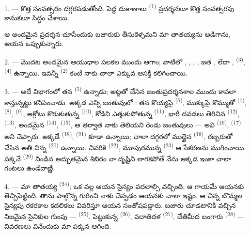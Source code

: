 1. --- కొత్త సంవత్సరం దగ్గరపడుతోంది. పెద్ద దుకాణాలు 
\textsuperscript{(1)} ప్రదర్శనలూ కొత్త సంవత్సరపు కానుకలూ సిద్ధం చేశాయి.

ఆ అందమైన ప్రదర్శన చూసేందుకు బజారుకు తీసుకెళ్ళమని మా తాతయ్యను అడిగాను, ఆయన ఒప్పుకున్నారు.

2. --- మొదట అందమైన ఆయుధాల పలకల ముందు ఆగాం; వాటిలో ,
, , , జత
, లేదా ,  \textsuperscript{(3)},
 \textsuperscript{(4)} ఉన్నాయి. ఇవన్నీ 
\textsuperscript{(2)} కంటే నాకు చాలా ఎక్కువ ఆసక్తి కలిగించాయి.

\VUsaut{3.0mm}
\VUsaut{2.6mm}

3. --- అదే విభాగంలో తన  
\textsuperscript{(5)} ఉన్నాడు; అట్టతో చేసిన జంతుప్రదర్శనశాల ముందు కాపలా కాస్తున్నట్టు
కనిపించాడు. అక్కడ ఎన్ని జంతువులో : తన కొయ్యపై  \textsuperscript{(6)},
ముక్కుపై కొమ్ముతో  \textsuperscript{(7)}, 
\textsuperscript{(8)},  \textsuperscript{(9)}, అక్రోటు కొరుకుతున్న
 \textsuperscript{(10)}, కోడిని ఎత్తుకుపోతున్న 
\textsuperscript{(11)}, భారీ దవడలు తెరిచిన  \textsuperscript{(12)},
 \textsuperscript{(13)}, అందమైన 
\textsuperscript{(14)},  \textsuperscript{(15)}, ఆ తర్వాత నాకు
తెలియని రెండు జంతువులు — అవి  \textsuperscript{(16)},
 \textsuperscript{(17)} అని చెప్పారు. అక్కడే 
\textsuperscript{(18)},  \textsuperscript{(21)} కూడా ఉన్నాయి; చాలా
దగ్గరలో ముద్దైన  \textsuperscript{(19)}, రబ్బరుతో చేసిన అతి చిన్న
 \textsuperscript{(20)} ఉన్నాయి. చివరికి 
\textsuperscript{(22)}, మూపురమున్న  \textsuperscript{(23)} ఆ
సేకరణను ముగించాయి. పక్కనే  \textsuperscript{(29)} నిండిన
అద్భుతమైన శిబిరం నా దృష్టిని లాగకపోతే నేను అక్కడ ఇంకా చాలా గంటలు ఉండేవాణ్ణి.

\VUsaut{4.0mm}
\VUsaut{2.8mm}

4. --- మా తాతయ్య  \textsuperscript{(24)}; ఒక 
వల్ల ఆయన సైన్యం వదలాల్సి వచ్చింది, ఆ గాయమే ఆయనకు  తెచ్చిపెట్టింది.
తాను పాల్గొన్న  గురించి నాకు చెప్పడం ఆయనకు చాలా ఇష్టం. ఆ చిన్న
బొమ్మల సైన్యపు రకరకాల కదలికలు వివరిస్తూ ఆయన సంతోషపడ్డారు. బజారు చూడటానికి వచ్చిన నిజమైన
సైనికుల గుంపు —  \textsuperscript{(25)},
 పెట్టుకున్న  \textsuperscript{(26)}, పదాతిదళ
 \textsuperscript{(27)}, చేతిమీద బంగారు 
 \textsuperscript{(28)} — వివరణలు వినేందుకు మా పక్కన ఆగింది.

